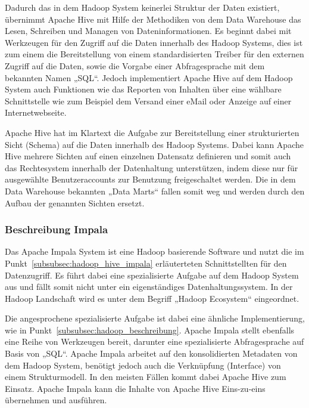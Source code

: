 Dadurch das in dem Hadoop System keinerlei Struktur der Daten existiert,
übernimmt Apache Hive mit Hilfe der Methodiken von dem Data Warehouse das
Lesen, Schreiben und Managen von Dateninformationen. Es beginnt dabei mit
Werkzeugen für den Zugriff auf die Daten innerhalb des Hadoop Systems, dies ist
zum einem die Bereitstellung von einem standardisierten Treiber für den
externen Zugriff auf die Daten, sowie die Vorgabe einer Abfragesprache mit dem
bekannten Namen „SQL“. Jedoch implementiert Apache Hive auf dem Hadoop System
auch Funktionen wie das Reporten von Inhalten über eine wählbare Schnittstelle
wie zum Beispiel dem Versand einer eMail oder Anzeige auf einer
Internetwebseite.

Apache Hive hat im Klartext die Aufgabe zur Bereitstellung einer strukturierten
Sicht (Schema) auf die Daten innerhalb des Hadoop Systems. Dabei kann Apache
Hive mehrere Sichten auf einen einzelnen Datensatz definieren und somit auch
das Rechtesystem innerhalb der Datenhaltung unterstützen, indem diese nur
für ausgewählte Benutzeraccounts zur Benutzung freigeschaltet werden. Die in
dem Data Warehouse bekannten „Data Marts“ fallen somit weg und werden durch
den Aufbau der genannten Sichten ersetzt.
\nl%

\subsubsection{Beschreibung Impala}
\label{subsubsec:impala_beschreibung}
Das Apache Impala System ist eine Hadoop basierende Software und nutzt die
im Punkt~\ref{subsubsec:hadoop_hive_impala} erläuterteten Schnittstellten
für den Datenzugriff. Es führt dabei eine spezialisierte Aufgabe auf dem
Hadoop System aus und fällt somit nicht unter ein eigenständiges
Datenhaltungssystem. In der Hadoop Landschaft wird es unter dem Begriff
„Hadoop Ecosystem“ eingeordnet.

Die angesprochene spezialisierte Aufgabe ist dabei eine ähnliche
Implementierung, wie in Punkt~\ref{subsubsec:hadoop_beschreibung}. Apache
Impala stellt ebenfalls eine Reihe von Werkzeugen bereit, darunter eine
spezialisierte Abfragesprache auf Basis von „SQL“. Apache Impala arbeitet auf
den konsolidierten Metadaten von dem Hadoop System, benötigt jedoch auch die
Verknüpfung (Interface) von einem Strukturmodell. In den meisten Fällen kommt
dabei Apache Hive zum Einsatz. Apache Impala kann die Inhalte von Apache Hive
Eins-zu-eins übernehmen und ausführen.

